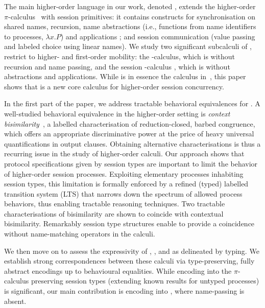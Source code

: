 The main higher-order language in our work, denoted \HOp,
extends the higher-order $\pi$-calculus~\cite{SangiorgiD:expmpa} with session primitives:
it contains constructs for 
synchronisation on shared names, 
recursion, 
name abstractions (i.e., functions from name identifiers  to processes, 
$\lambda x.P$) and applications 
;
and session communication (value passing and
labeled choice using linear names). 
We study two significant subcalculi of \HOp, 
restrict to higher- and first-order mobility:
the \HO-calculus, which is \HOp without recursion and name passing, and 
the session \sessp-calculus , which is \HOp without abstractions and applications.  
While \sessp is 
in essence the calculus in~\cite{honda.vasconcelos.kubo:language-primitives}, 
this paper shows that \HO  is a new core calculus 
for higher-order session concurrency.

In the first part of the paper, we address tractable behavioral equivalences
for \HOp.
A well-studied behavioral equivalence in the higher-order setting 
is \emph{context bisimilarity}~\cite{San96H},
a labelled characterisation of reduction-closed, barbed congruence, 
which offers an appropriate discriminative power at the price of heavy universal quantifications in output clauses.
Obtaining alternative characterisations 
is thus a recurring issue 
in the study of higher-order calculi. 
Our approach 
shows that protocol specifications given by session types are 
important to  limit 
the behavior of higher-order session processes. 
Exploiting elementary processes inhabiting session types, 
this limitation is formally enforced by 
a refined (typed) labelled transition system (LTS)
that narrows down the spectrum of allowed process behaviors, 
thus enabling tractable reasoning techniques. 
Two tractable characterisations of bisimilarity 
are shown to coincide with contextual bisimilarity.
Remarkably session type structures enable to provide 
a coincidence without name-matching operators in the calculi.

We then move on to 
assess the expressivity 
 of \HOp, \HO, and \sessp as delineated by typing. 
We establish strong correspondences between 
these calculi  via type-preserving, fully abstract encodings up to 
behavioural equalities. While encoding \HOp 
into the $\pi$-calculus preserving session types 
(extending  known  results for untyped processes) is 
significant, 
our main contribution is 
encoding \HOp into \HO, where name-passing is absent.  

